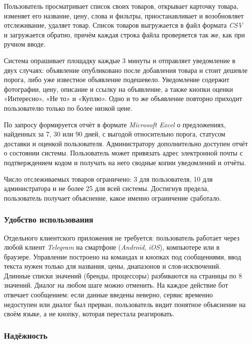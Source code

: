 Пользователь просматривает список своих товаров, открывает карточку товара, изменяет его название, цену, слова и фильтры, приостанавливает и возобновляет отслеживание, удаляет товар. Список товаров выгружается в файл формата \textit{CSV} и загружается обратно, причём каждая строка файла проверяется так же, как при ручном вводе.

Система опрашивает площадку каждые 3 минуты и отправляет уведомление в двух случаях: объявление опубликовано после добавления товара и стоит дешевле порога, либо уже известное объявление подешевело. Уведомление содержит фотографии, цену, описание и ссылку на объявление, а также кнопки оценки «Интересно», «Не то» и «Куплю». Одно и то же объявление повторно приходит пользователю только по более низкой цене.

По запросу формируется отчёт в формате \textit{Microsoft Excel} о предложениях, найденных за 7, 30 или 90 дней, с выгодой относительно порога, статусом доставки и оценкой пользователя. Администратору дополнительно доступен отчёт о состоянии системы. Пользователь может привязать адрес электронной почты с подтверждением кодом и получать на него сводные копии уведомлений и отчёты.

Число отслеживаемых товаров ограничено: 3 для пользователя, 10 для администратора и не более 25 для всей системы. Достигнув предела, пользователь получает объяснение, какое именно ограничение сработало.

\subsubsection{Удобство использования}

Отдельного клиентского приложения не требуется: пользователь работает через любой клиент \textit{Telegram} на смартфоне (\textit{Android}, \textit{iOS}), компьютере или в браузере. Управление построено на командах и кнопках под сообщениями, ввод текста нужен только для названия, цены, диапазонов и слов-исключений. Длинные списки значений (бренды, процессоры) разбиваются на страницы по 8 значений. Диалог на любом шаге можно отменить. На каждое действие бот отвечает сообщением: если данные введены неверно, сервис временно недоступен или диалог был прерван, пользователь видит понятное объяснение на своём языке, а не кнопку, которая перестала реагировать.

\subsubsection{Надёжность}


